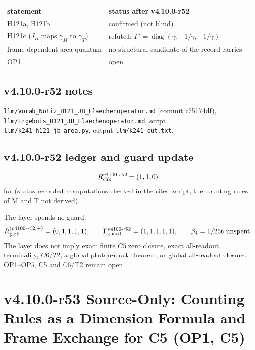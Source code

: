 \begin{center}
\small
\begin{tabular}{@{}>{\raggedright\arraybackslash}p{}>{\raggedright\arraybackslash}p{}@{}}
\toprule
statement & status after v4.10.0-r52\\
\midrule
H121a, H121b & confirmed (not blind)\\
H121c (\(J_B\) maps \(\gamma_M\) to \(\gamma_T\)) & refuted: \(\Gamma'=\operatorname{diag}(\gamma,-1/\gamma,-1/\gamma)\)\\
frame-dependent area quantum & no structural candidate of the record carries\\
OP1 & open\\
\bottomrule
\end{tabular}
\end{center}

\subsection*{v4.10.0-r52 notes}
\label{subsec:v4100-r52-notes}

\texttt{llm/\allowbreak Vorab\_\allowbreak Notiz\_\allowbreak H121\_\allowbreak JB\_\allowbreak Flaechenoperator.md} (commit c35174df),
\texttt{llm/\allowbreak Ergebnis\_\allowbreak H121\_\allowbreak JB\_\allowbreak Flaechenoperator.md}, script \texttt{llm/\allowbreak k241\_\allowbreak h121\_\allowbreak jb\_\allowbreak area.py},
output \texttt{llm/\allowbreak k241\_\allowbreak out.txt}.

\subsection*{v4.10.0-r52 ledger and guard update}
\label{subsec:v4100-r52-ledger-guard}

\[
R_{\rm chk}^{v4100\text{-}r52}=(1,1,0)
\]
for (status recorded; computations checked in the cited script; the counting rules of M and T not derived).

The layer spends no guard:
\[
R_{\rm glob}^{(v4100\text{-}r52,+)}=(0,1,1,1,1),
\qquad
\Gamma_{\rm guard}^{v4100\text{-}r52}=(1,1,1,1,1),
\qquad
\beta_4=1/256\ \text{unspent}.
\]
The layer does not imply exact finite \(C5\) zero closure, exact all-readout terminality, \(C6/T2\), a global photon-clock theorem,
or global all-readout closure.  OP1--OP5, C5 and C6/T2 remain open.

\clearpage
\section*{v4.10.0-r53 Source-Only: Counting Rules as a Dimension Formula and Frame Exchange for C5 (OP1, C5)}
\label{sec:v4100-r53-dimension-exchange}

